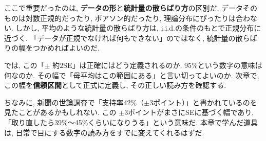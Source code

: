     ここで重要だったのは, \textbf{データの形}と\textbf{統計量の散らばり方}の区別だ.
    データそのものは対数正規的だったり, ポアソン的だったり, 理論分布にぴったりは合わない.
    しかし, 平均のような統計量の散らばり方は, i.i.d.の条件のもとで正規分布に近づく.
    「データが正規でなければ何もできない」のではなく, 統計量の散らばりの幅をつかめればよいのだ.

    では, この「$\pm$ 約$2$SE」は正確にはどう定義されるのか.
    95\%という数字の意味は何なのか.
    その幅で「母平均はこの範囲にある」と言い切ってよいのか.
    次章で, この幅を\textbf{信頼区間}として正式に定義し, その正しい読み方を確認する.

    ちなみに, 新聞の世論調査で「支持率42\%（$\pm 3$ポイント）」と書かれているのを見たことがあるかもしれない.
    この $\pm 3$ポイントがまさにSEに基づく幅であり, 「取り直したら39\%〜45\%くらいになりうる」という意味だ.
    本章で学んだ道具は, 日常で目にする数字の読み方をすでに変えてくれるはずだ.

